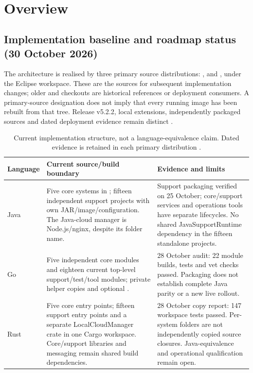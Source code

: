 \documentclass[a4paper]{arrowhead}
\begin{document}
\newpage

\tableofcontents
\newpage

\section{Overview}
\label{sec:overview}



\subsection{Implementation baseline and roadmap status (30 October 2026)}
\label{sec:baseline-20261030}
The architecture is realised by three primary source distributions:
,  and
, under the Eclipse workspace. These are the
sources for subsequent implementation changes; older  and
 checkouts are historical references or deployment consumers.
A primary-source designation does not imply that every running image has been
rebuilt from that tree. Release v5.2.2, local extensions, independently packaged
sources and dated deployment evidence remain distinct \cite{primaryBaseline20261030}.

\begin{table}[htbp]
\centering\small
\begin{tabularx}{\textwidth}{|P{1.6cm}|X|X|}\hline
{} Language & Current source/build boundary & Evidence and limits \\\hline
Java & Five core systems in ; fifteen independent
support projects with own JAR/image/configuration. The Java-cloud manager is
Node.js/nginx, despite its folder name. & Support packaging verified on
25 October; core/support services and operations tools have separate lifecycles.
No shared JavaSupportRuntime dependency in the fifteen standalone projects. \\\hline
Go & Five independent core modules and eighteen current top-level support/test/tool
modules; private helper copies and optional . & 28 October audit:
22 module builds, tests and vet checks passed. Packaging does not establish
complete Java parity or a new live rollout. \\\hline
Rust & Five core entry points; fifteen support entry points and a separate
LocalCloudManager crate in one Cargo workspace. Core/support libraries and
messaging remain shared build dependencies. & 28 October copy report:
147 workspace tests passed. Per-system folders are not independently copied
source closures. Java-equivalence and operational qualification remain open. \\\hline
\end{tabularx}
\caption{Current implementation structure, not a language-equivalence claim.
Dated evidence is retained in each primary distribution
\cite{javaPackaging20261025,goPackaging20261028,rustPackaging20261028}.}
\end{table}
\FloatBarrier
\end{document}
